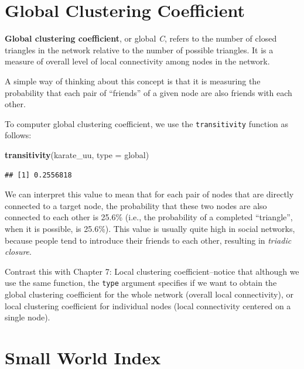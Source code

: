 \documentclass[
]{book}
\newenvironment{Shaded}{\begin{snugshade}}{\end{snugshade}}
\newcommand{\AttributeTok}[1]{\textcolor[rgb]{0.13,0.29,0.53}{#1}}
\newcommand{\FunctionTok}[1]{\textcolor[rgb]{0.13,0.29,0.53}{\textbf{#1}}}
\newcommand{\NormalTok}[1]{#1}
\newcommand{\StringTok}[1]{\textcolor[rgb]{0.31,0.60,0.02}{#1}}
\begin{document}
\section{Global Clustering Coefficient}\label{global-clustering-coefficient}

\textbf{Global clustering coefficient}, or global \emph{C}, refers to the number of closed triangles in the network relative to the number of possible triangles. It is a measure of overall level of local connectivity among nodes in the network.

A simple way of thinking about this concept is that it is measuring the probability that each pair of ``friends'' of a given node are also friends with each other.

To computer global clustering coefficient, we use the \texttt{transitivity} function as follows:

\begin{Shaded}
\begin{Highlighting}[]
\FunctionTok{transitivity}\NormalTok{(karate\_uu, }\AttributeTok{type =} \StringTok{\textquotesingle{}global\textquotesingle{}}\NormalTok{)}
\end{Highlighting}
\end{Shaded}

\begin{verbatim}
## [1] 0.2556818
\end{verbatim}

We can interpret this value to mean that for each pair of nodes that are directly connected to a target node, the probability that these two nodes are also connected to each other is 25.6\% (i.e., the probability of a completed ``triangle'', when it is possible, is 25.6\%). This value is usually quite high in social networks, because people tend to introduce their friends to each other, resulting in \emph{triadic closure}.

Contrast this with Chapter 7: Local clustering coefficient--notice that although we use the same function, the \texttt{type} argument specifies if we want to obtain the global clustering coefficient for the whole network (overall local connectivity), or local clustering coefficient for individual nodes (local connectivity centered on a single node).

\section{Small World Index}\label{small-world-index}
\end{document}
